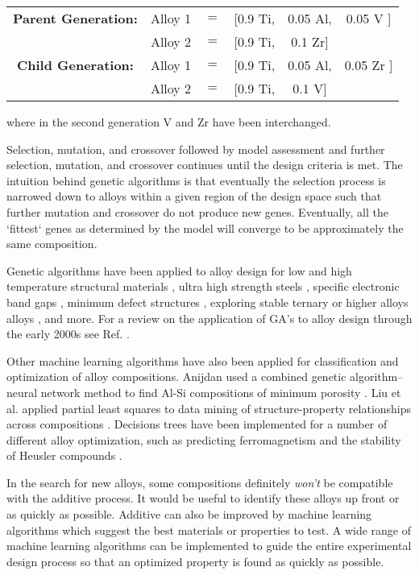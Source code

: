 \begin{table}[h!]
\begin{center}
\begin{tabular}{c|ccccc}
	\textbf{Parent Generation:} & Alloy 1 & $=$ & [0.9 Ti, & 0.05 Al, & 0.05 {\color{red} V} ]  \\
						 & Alloy 2 & $=$ & [0.9 Ti, & 0.1 {\color{green} Zr}] &              \\ \hline					 
	 \textbf{Child Generation:} & Alloy 1 & $=$ & [0.9 Ti, & 0.05 Al, & 0.05 {\color{green} Zr} ]  \\
						& Alloy 2 & $=$ & [0.9 Ti, & 0.1 {\color{red} V}] &              \\ 
\end{tabular}
\end{center}
\end{table}
\noindent where in the second generation V and Zr have been interchanged.

Selection, mutation, and crossover followed by model assessment and further selection, mutation, and crossover continues until the design criteria is met. The intuition behind genetic algorithms is that eventually the selection process is narrowed down to alloys within a given region of the design space such that further mutation and crossover do not produce new genes. Eventually, all the `fittest` genes as determined by the model will converge to be approximately the same composition. 

Genetic algorithms have been applied to alloy design for low and high temperature structural materials \cite{Ikeda1997, Kulkarni2004}, ultra high strength steels \cite{Xu2008}, specific electronic band gaps \cite{Dudiy2006}, minimum defect structures \cite{Anijdan2006}, exploring stable ternary or higher alloys alloys \cite{Hautier2010, Johannesson2002}, and more. For a review on the application of GA's to alloy design through the early 2000s see Ref. \cite{Chakraborti2004}.

Other machine learning algorithms have also been applied for classification and optimization of alloy compositions. Anijdan used a combined genetic algorithm--neural network method to find Al-Si compositions of minimum porosity \cite{Anijdan2006}. Liu et al. applied partial least squares to data mining of structure-property relationships across compositions \cite{Liu2006}. Decisions trees have been implemented for a number of different alloy optimization, such as predicting ferromagnetism \cite{Landrum2003} and the stability of Heusler compounds \cite{Oliynyk2016}. 
 
In the search for new alloys, some compositions definitely \textit{won't} be compatible with the additive process. It would be useful to identify these alloys up front or as quickly as possible. Additive can also be improved by machine learning algorithms which suggest the best materials or properties to test. A wide range of machine learning algorithms can be implemented to guide the entire experimental design process so that an optimized property is found as quickly as possible. 